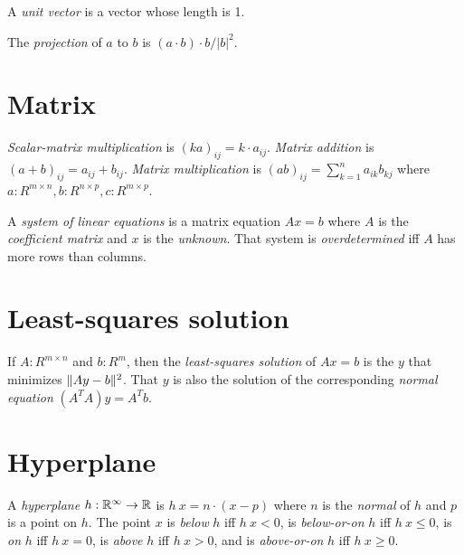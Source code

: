 %
%
A \emph{unit vector} is a vector whose length is 1.

%
%
%
The \emph{projection} of \(a\) to \(b\) is \((a \cdot b) \cdot b / |b|^2\).

\section{Matrix}

%
\emph{Scalar-matrix multiplication} is \((ka)_{ij} = k \cdot a_{ij}\).
%
%
\emph{Matrix addition} is \((a + b)_{ij} = a_{ij} + b_{ij}\).
%
%
\emph{Matrix multiplication} is \((ab)_{ij} = \sum_{k=1}^n a_{ik} b_{kj}\) where
\(a : R^{m \times n}, b : R^{n \times p}, c : R^{m \times p}\).

%
%
%
%
A \emph{system of linear equations} is a matrix equation \(A x = b\)
where \(A\) is the \emph{coefficient matrix} and \(x\) is the \emph{unknown}.
%
%
That system is \emph{overdetermined} iff \(A\) has more rows than columns.

\section{Least-squares solution}

%
%
%
If \(A : R^{m \times n}\) and \(b : R^m\),
then the \emph{least-squares solution} of \(A x = b\)
is the \(y\) that minimizes \(\lVert A y - b\rVert^2\).
%
That \(y\) is also the solution of the corresponding \emph{normal equation}
\((A^T A) y = A^T b\).

\section{Hyperplane}

%
%
%
%
%
%
A \emph{hyperplane}
\(h : \mathbb{R}^\infty \to \mathbb{R}\)
is \(h~x = n \cdot (x - p)\)
where \(n\) is the \emph{normal} of \(h\)
and \(p\) is a point on \(h\).
The point \(x\)
is \emph{below} \(h\) iff \( h~x < 0 \),
is \emph{below-or-on} \(h\) iff \( h~x \le 0 \),
is \emph{on} \(h\) iff \( h~x = 0 \),
is \emph{above} \(h\) iff \( h~x > 0 \),
and
is \emph{above-or-on} \(h\) iff \( h~x \ge 0 \).

